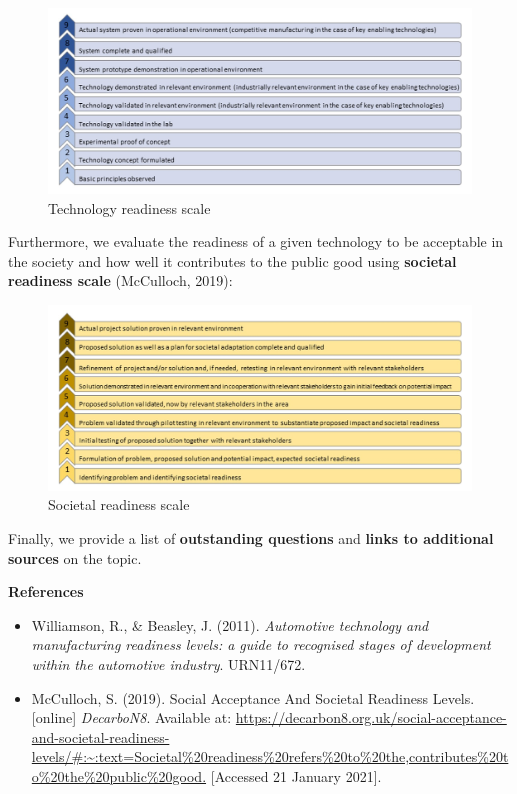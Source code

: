\documentclass[
]{book}
\providecommand{\tightlist}{%
  \setlength{\itemsep}{0pt}\setlength{\parskip}{0pt}}
\begin{document}
\begin{figure}
\includegraphics[width=0.9\linewidth]{image/TRL_cropped} \caption{Technology readiness scale}\label{fig:unnamed-chunk-3}
\end{figure}

Furthermore, we evaluate the readiness of a given technology to be acceptable in the society and how well it contributes to the public good using \textbf{societal readiness scale} (McCulloch, 2019):

\begin{figure}
\includegraphics[width=0.9\linewidth]{image/SRL_cropped} \caption{Societal readiness scale}\label{fig:unnamed-chunk-4}
\end{figure}

Finally, we provide a list of \textbf{outstanding questions} and \textbf{links to additional sources} on the topic.

\textbf{References}

\begin{itemize}
\tightlist
\item
  Williamson, R., \& Beasley, J. (2011). \emph{Automotive technology and manufacturing readiness levels: a guide to recognised stages of development within the automotive industry}. URN11/672.
\item
  McCulloch, S. (2019). Social Acceptance And Societal Readiness Levels. {[}online{]} \emph{DecarboN8}. Available at: \url{https://decarbon8.org.uk/social-acceptance-and-societal-readiness-levels/\#:~:text=Societal\%20readiness\%20refers\%20to\%20the,contributes\%20to\%20the\%20public\%20good.} {[}Accessed 21 January 2021{]}.
\end{itemize}
\end{document}
